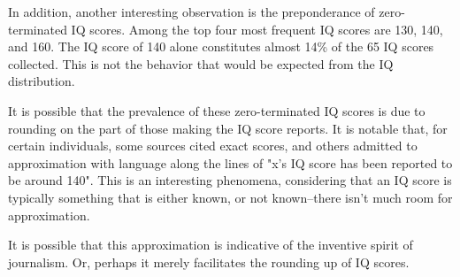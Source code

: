 \documentclass[12pt,letterpaper,titlepage,oneside,draft]{article}
\begin{document}
In addition, another interesting observation is the preponderance of zero-terminated IQ scores. Among the top four most frequent IQ scores are 130, 140, and 160. The IQ score of 140 alone constitutes almost 14\% of the 65 IQ scores collected. This is not the behavior that would be expected from the IQ distribution.  

It is possible that the prevalence of these zero-terminated IQ scores is due to rounding on the part of those making the IQ score reports. It is notable that, for certain individuals, some sources cited exact scores, and others admitted to approximation with language along the lines of "x's IQ score has been reported to be around 140". This is an interesting phenomena, considering that an IQ score is typically something that is either known, or not known--there isn't much room for approximation.

It is possible that this approximation is indicative of the inventive spirit of journalism. Or, perhaps it merely facilitates the rounding up of IQ scores.
\end{document}
